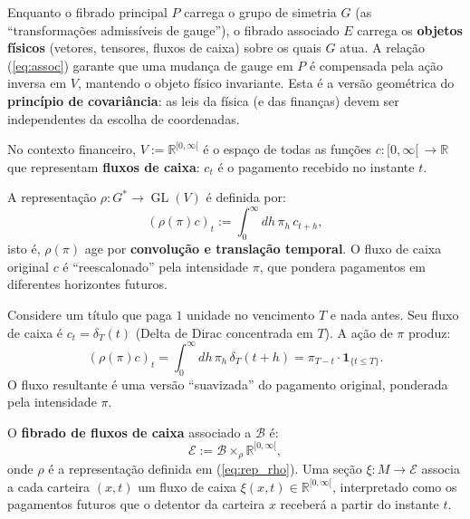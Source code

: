 \begin{obs}
Enquanto o fibrado principal $P$ carrega o grupo de simetria $G$ (as
``transforma\c{c}\~oes admiss\'iveis de gauge''), o fibrado associado $E$
carrega os \textbf{objetos f\'isicos} (vetores, tensores, fluxos de caixa)
sobre os quais $G$ atua. A rela\c{c}\~ao (\ref{eq:assoc}) garante que uma
mudan\c{c}a de gauge em $P$ \'e compensada pela a\c{c}\~ao inversa em $V$,
mantendo o objeto f\'isico invariante. Esta \'e a vers\~ao geom\'etrica do
\textbf{princ\'ipio de covari\^ancia}: as leis da f\'isica (e das finan\c{c}as)
devem ser independentes da escolha de coordenadas.
\end{obs}

No contexto financeiro, $V := \mathbb{R}^{[0,\infty[}$ \'e o espa\c{c}o de todas
as fun\c{c}\~oes $c: [0,\infty[\, \to \mathbb{R}$ que representam
\textbf{fluxos de caixa}: $c_t$ \'e o pagamento recebido no instante $t$.

\begin{defi}\label{def:rep_V}
A representa\c{c}\~ao $\rho: G^* \to \operatorname{GL}(V)$ \'e definida por:
\begin{equation}\label{eq:rep_rho}
 (\rho(\pi) c)_t := \int_0^\infty dh \, \pi_h \, c_{t+h},
\end{equation}
isto \'e, $\rho(\pi)$ age por \textbf{convolu\c{c}\~ao e transla\c{c}\~ao
temporal}. O fluxo de caixa original $c$ \'e ``reescalonado'' pela
intensidade $\pi$, que pondera pagamentos em diferentes horizontes futuros.
\end{defi}

\begin{ex}
Considere um t\'itulo que paga $1$ unidade no vencimento $T$ e nada antes.
Seu fluxo de caixa \'e $c_t = \delta_T(t)$ (Delta de Dirac concentrada em
$T$). A a\c{c}\~ao de $\pi$ produz:
\begin{equation}
 (\rho(\pi) c)_t = \int_0^\infty dh \, \pi_h \, \delta_T(t+h)
 = \pi_{T-t} \cdot \mathbf{1}_{\{t \leq T\}}.
\end{equation}
O fluxo resultante \'e uma vers\~ao ``suavizada'' do pagamento original,
ponderada pela intensidade $\pi$.
\end{ex}

\begin{defi}\label{def:fibrado_cashflow}
O \textbf{fibrado de fluxos de caixa} associado a $\mathcal{B}$ \'e:
\begin{equation}\label{eq:mathcal_E}
 \mathcal{E} := \mathcal{B} \times_\rho \mathbb{R}^{[0,\infty[},
\end{equation}
onde $\rho$ \'e a representa\c{c}\~ao definida em (\ref{eq:rep_rho}). Uma
se\c{c}\~ao $\xi: M \to \mathcal{E}$ associa a cada carteira $(x,t)$ um
fluxo de caixa $\xi(x,t) \in \mathbb{R}^{[0,\infty[}$, interpretado como os
pagamentos futuros que o detentor da carteira $x$ receber\'a a partir do
instante $t$.
\end{defi}

